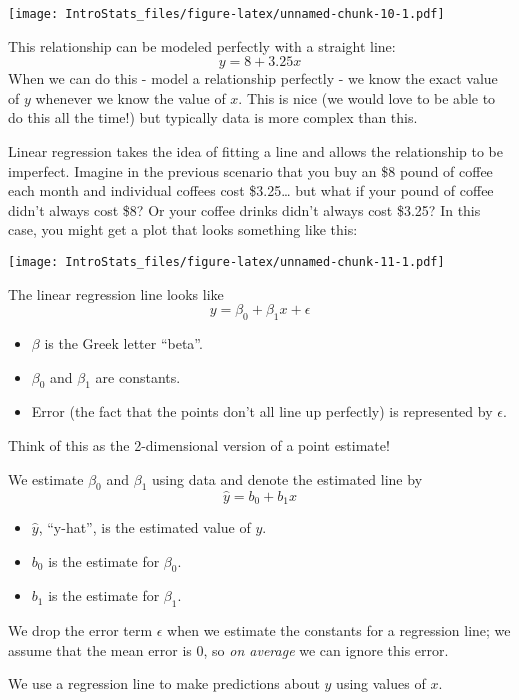 \documentclass[
]{book}
\providecommand{\tightlist}{%
  \setlength{\itemsep}{0pt}\setlength{\parskip}{0pt}}
\begin{document}
\texttt{[image: IntroStats\_files/figure-latex/unnamed-chunk-10-1.pdf]}

This relationship can be modeled perfectly with a straight line:
\[
y = 8 + 3.25x
\]
When we can do this - model a relationship perfectly - we know the exact value of \(y\) whenever we know the value of \(x\). This is nice (we would love to be able to do this all the time!) but typically data is more complex than this.

Linear regression takes the idea of fitting a line and allows the relationship to be imperfect. Imagine in the previous scenario that you buy an \$8 pound of coffee each month and individual coffees cost \$3.25\ldots{} but what if your pound of coffee didn't always cost \$8? Or your coffee drinks didn't always cost \$3.25? In this case, you might get a plot that looks something like this:

\texttt{[image: IntroStats\_files/figure-latex/unnamed-chunk-11-1.pdf]}

The linear regression line looks like
\[
y = \beta_0 + \beta_1x + \epsilon
\]

\begin{itemize}
\tightlist
\item
  \(\beta\) is the Greek letter ``beta''.
\item
  \(\beta_0\) and \(\beta_1\) are constants.
\item
  Error (the fact that the points don't all line up perfectly) is represented by \(\epsilon\).
\end{itemize}

Think of this as the 2-dimensional version of a point estimate!

We estimate \(\beta_0\) and \(\beta_1\) using data and denote the estimated line by
\[
\hat{y} = b_0 + b_1x
\]

\begin{itemize}
\tightlist
\item
  \(\hat{y}\), ``y-hat'', is the estimated value of \(y\).
\item
  \(b_0\) is the estimate for \(\beta_0\).
\item
  \(b_1\) is the estimate for \(\beta_1\).
\end{itemize}

We drop the error term \(\epsilon\) when we estimate the constants for a regression line; we assume that the mean error is 0, so \emph{on average} we can ignore this error.

We use a regression line to make predictions about \(y\) using values of \(x\).
\end{document}
